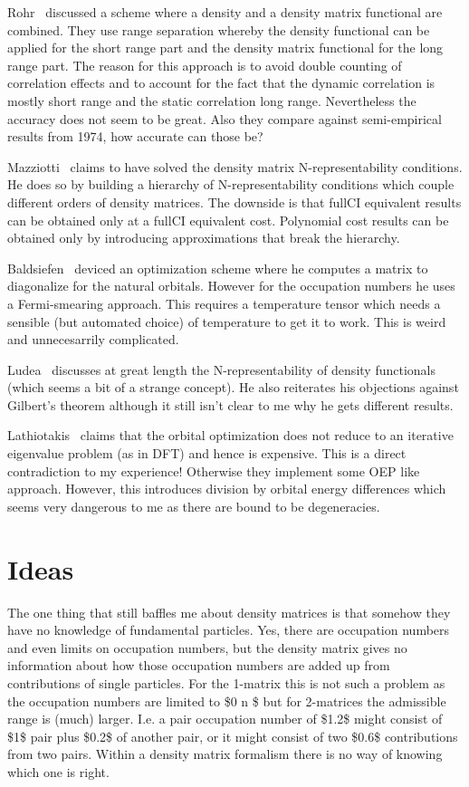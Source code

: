 \documentclass{article}
\begin{document}
Rohr~\cite{Rohr_2010} discussed a scheme where a density and a density matrix
functional are combined. They use range separation whereby the density 
functional can be applied for the short range part and the density matrix
functional for the long range part. The reason for this approach is to avoid
double counting of correlation effects and to account for the fact that
the dynamic correlation is mostly short range and the static correlation long
range. Nevertheless the accuracy does not seem to be great. Also they compare
against semi-empirical results from 1974, how accurate can those be?

Mazziotti~\cite{Mazziotti_2012,Mazziotti_2012_a} claims to have solved the
density matrix N-representability conditions. He does so by building a 
hierarchy of N-representability conditions which couple different orders
of density matrices. The downside is that fullCI equivalent results can be
obtained only at a fullCI equivalent cost. Polynomial cost results can be
obtained only by introducing approximations that break the hierarchy.

Baldsiefen~\cite{Baldsiefen_2013} deviced an optimization scheme where he 
computes a matrix to diagonalize for the natural orbitals. However for the
occupation numbers he uses a Fermi-smearing approach. This requires a
temperature tensor which needs a sensible (but automated choice) of
temperature to get it to work. This is weird and unnecesarrily complicated.

Ludea~\cite{Lude_a_2013} discusses at great length the
N-representability of density functionals (which seems a bit of a strange
concept). He also reiterates his objections against Gilbert's theorem although
it still isn't clear to me why he gets different results.

Lathiotakis~\cite{Lathiotakis_2014} claims that the orbital optimization does
not reduce to an iterative eigenvalue problem (as in DFT) and hence is 
expensive. This is a direct contradiction to my experience! Otherwise they 
implement some OEP like approach. However, this introduces division by
orbital energy differences which seems very dangerous to me as there are bound
to be degeneracies.

\section{Ideas}

The one thing that still baffles me about density matrices is that somehow they
have no knowledge of fundamental particles. Yes, there are occupation numbers
and even limits on occupation numbers, but the density matrix gives no
information about how those occupation numbers are added up from contributions
of single particles. For the 1-matrix this is not such a problem as the
occupation numbers are limited to \$0 \le n \$ but for 2-matrices the
admissible range is (much) larger. I.e. a pair occupation number of \$1.2\$ 
might consist of \$1\$ pair plus \$0.2\$ of another pair, or it might consist
of two \$0.6\$ contributions from two pairs. Within a density matrix 
formalism there is no way of knowing which one is right.
\end{document}
